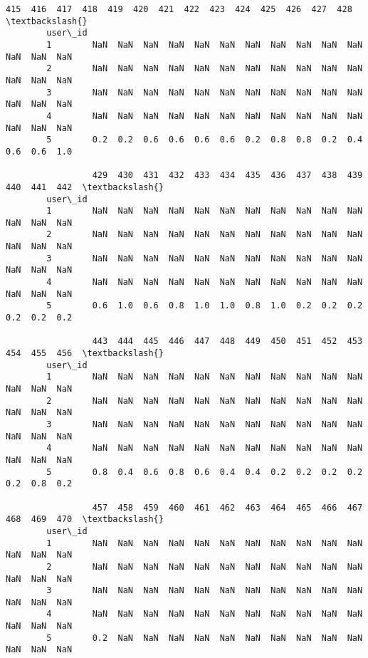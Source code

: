 \documentclass[11pt]{article}
\begin{document}
\begin{Verbatim}[commandchars=\\\{\}]
                 415  416  417  418  419  420  421  422  423  424  425  426  427  428  \textbackslash{}
        user\_id                                                                         
        1        NaN  NaN  NaN  NaN  NaN  NaN  NaN  NaN  NaN  NaN  NaN  NaN  NaN  NaN   
        2        NaN  NaN  NaN  NaN  NaN  NaN  NaN  NaN  NaN  NaN  NaN  NaN  NaN  NaN   
        3        NaN  NaN  NaN  NaN  NaN  NaN  NaN  NaN  NaN  NaN  NaN  NaN  NaN  NaN   
        4        NaN  NaN  NaN  NaN  NaN  NaN  NaN  NaN  NaN  NaN  NaN  NaN  NaN  NaN   
        5        0.2  0.2  0.6  0.6  0.6  0.6  0.2  0.8  0.8  0.2  0.4  0.6  0.6  1.0   
        
                 429  430  431  432  433  434  435  436  437  438  439  440  441  442  \textbackslash{}
        user\_id                                                                         
        1        NaN  NaN  NaN  NaN  NaN  NaN  NaN  NaN  NaN  NaN  NaN  NaN  NaN  NaN   
        2        NaN  NaN  NaN  NaN  NaN  NaN  NaN  NaN  NaN  NaN  NaN  NaN  NaN  NaN   
        3        NaN  NaN  NaN  NaN  NaN  NaN  NaN  NaN  NaN  NaN  NaN  NaN  NaN  NaN   
        4        NaN  NaN  NaN  NaN  NaN  NaN  NaN  NaN  NaN  NaN  NaN  NaN  NaN  NaN   
        5        0.6  1.0  0.6  0.8  1.0  1.0  0.8  1.0  0.2  0.2  0.2  0.2  0.2  0.2   
        
                 443  444  445  446  447  448  449  450  451  452  453  454  455  456  \textbackslash{}
        user\_id                                                                         
        1        NaN  NaN  NaN  NaN  NaN  NaN  NaN  NaN  NaN  NaN  NaN  NaN  NaN  NaN   
        2        NaN  NaN  NaN  NaN  NaN  NaN  NaN  NaN  NaN  NaN  NaN  NaN  NaN  NaN   
        3        NaN  NaN  NaN  NaN  NaN  NaN  NaN  NaN  NaN  NaN  NaN  NaN  NaN  NaN   
        4        NaN  NaN  NaN  NaN  NaN  NaN  NaN  NaN  NaN  NaN  NaN  NaN  NaN  NaN   
        5        0.8  0.4  0.6  0.8  0.6  0.4  0.4  0.2  0.2  0.2  0.2  0.2  0.8  0.2   
        
                 457  458  459  460  461  462  463  464  465  466  467  468  469  470  \textbackslash{}
        user\_id                                                                         
        1        NaN  NaN  NaN  NaN  NaN  NaN  NaN  NaN  NaN  NaN  NaN  NaN  NaN  NaN   
        2        NaN  NaN  NaN  NaN  NaN  NaN  NaN  NaN  NaN  NaN  NaN  NaN  NaN  NaN   
        3        NaN  NaN  NaN  NaN  NaN  NaN  NaN  NaN  NaN  NaN  NaN  NaN  NaN  NaN   
        4        NaN  NaN  NaN  NaN  NaN  NaN  NaN  NaN  NaN  NaN  NaN  NaN  NaN  NaN   
        5        0.2  NaN  NaN  NaN  NaN  NaN  NaN  NaN  NaN  NaN  NaN  NaN  NaN  NaN   
        

\end{Verbatim}
\end{document}
